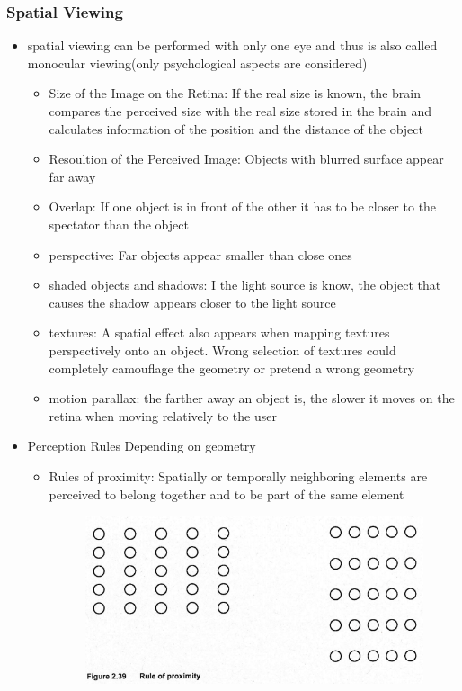 \documentclass{standalone}
\begin{document}
\subsubsection*{Spatial Viewing}
\begin{itemize}
\item spatial viewing can be performed with only one eye and thus is also called monocular viewing(only psychological aspects are considered)
	\begin{itemize}
		\item Size of the Image on the Retina: If the real size is known, the brain compares the perceived size with the real size stored in the brain and calculates information of the position and the distance of the object
		\item Resoultion of the Perceived Image: Objects with blurred surface appear far away
		\item Overlap: If one object is in front of the other it has to be closer to the spectator than the object
		\item perspective: Far objects appear smaller than close ones
		\item shaded objects and shadows: I the light source is know, the object that causes the shadow appears closer to the light source
		\item textures: A spatial effect also appears when mapping textures perspectively onto an object. Wrong selection of textures could completely camouflage the geometry or pretend a wrong geometry
		\item motion parallax: the farther away an object is, the slower it moves on the retina when moving relatively to the user
	\end{itemize}
	\item Perception Rules Depending on geometry
	\begin{itemize}
		\item Rules of proximity: Spatially or temporally neighboring elements are perceived to belong together and to be part of the same element
		\begin{figure}[H]
			\centering
			\includegraphics[width = 0.5\linewidth]{Figures/2_39.png}
		\end{figure}

\end{itemize}
\end{itemize}
\end{document}
